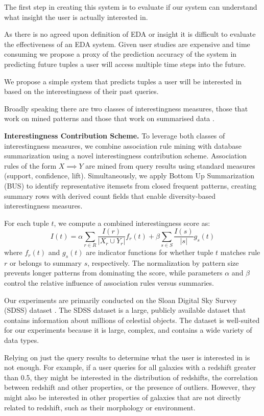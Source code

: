 \documentclass[sigconf, nonacm]{acmart}
\begin{document}
The first step in creating this system is to evaluate if our system can understand what insight the user is actually interested in. 

As there is no agreed upon definition of EDA or insight it is difficult to evaluate the effectiveness of an EDA system. Given user studies are expensive and time consuming we propose a proxy of the prediction accuracy of the system in predicting future tuples a user will access multiple time steps into the future. 

We propose a simple system that predicts tuples a user will be interested in based on the interestingness of their past queries.

Broadly speaking there are two classes of interestingness measures, those that work on mined patterns and those that work on summarised data \cite{robertj.hildermanKnowledgeDiscoveryMeasures2001}. 

\textbf{Interestingness Contribution Scheme.} To leverage both classes of interestingness measures, we combine association rule mining with database summarization using a novel interestingness contribution scheme. Association rules of the form $X \implies Y$ are mined from query results using standard measures (support, confidence, lift). Simultaneously, we apply Bottom Up Summarization (BUS) \cite{chandola_summarizationcompressing_2007} to identify representative itemsets from closed frequent patterns, creating summary rows with derived count fields that enable diversity-based interestingness measures.

For each tuple $t$, we compute a combined interestingness score as:
\[
I(t) = \alpha \sum_{r\in R} \frac{I(r)}{|X_r \cup Y_r|} f_r(t) + \beta \sum_{s\in S} \frac{I(s)}{|s|} g_s(t)
\]
where $f_r(t)$ and $g_s(t)$ are indicator functions for whether tuple $t$ matches rule $r$ or belongs to summary $s$, respectively. The normalization by pattern size prevents longer patterns from dominating the score, while parameters $\alpha$ and $\beta$ control the relative influence of association rules versus summaries.

Our experiments are primarily conducted on the Sloan Digital Sky Survey (SDSS) dataset \cite{york_sloan_2000}. The SDSS dataset is a large, publicly available dataset that contains information about millions of celestial objects. The dataset is well-suited for our experiments because it is large, complex, and contains a wide variety of data types.

Relying on just the query results to determine what the user is interested in is not enough. For example, if a user queries for all galaxies with a redshift greater than 0.5, they might be interested in the distribution of redshifts, the correlation between redshift and other properties, or the presence of outliers. However, they might also be interested in other properties of galaxies that are not directly related to redshift, such as their morphology or environment.
\end{document}
